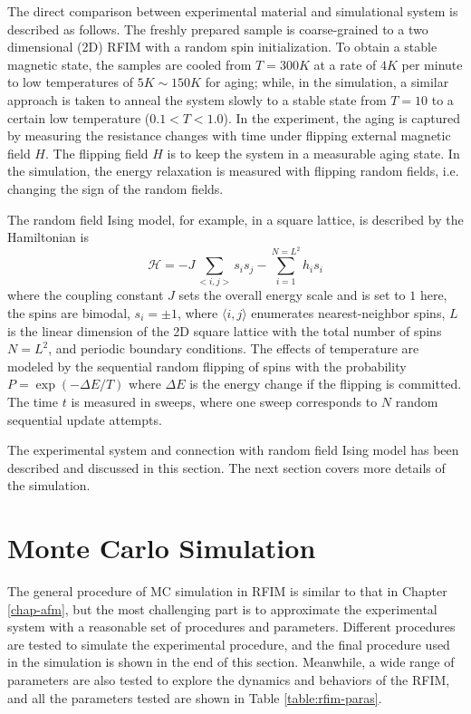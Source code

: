 The direct comparison between experimental material and simulational system is described as follows. The freshly prepared sample is coarse-grained to a two dimensional (2D) RFIM with a random spin initialization.  To obtain a stable magnetic state, the samples are cooled from $T=300K$ at a rate of $4K$ per minute to  low temperatures of $5K \sim 150K$ for aging; while, in the simulation, a similar approach is taken to anneal the system slowly to a stable state from $T=10$ to a certain low temperature ($0.1<T<1.0$). In the experiment, the aging is captured by measuring the resistance changes with time under flipping external magnetic field $H$. The flipping field $H$ is to keep the system in a measurable aging state. In the simulation, the energy relaxation is measured with flipping random fields, i.e. changing the sign of the random fields.

The random field Ising model, for example, in a square lattice, is described by the Hamiltonian is
\begin{equation}\label{energy}
\mathcal{H}=-J\sum_{<i,j>}s_{i}s_{j}-\sum_{i=1}^{N=L^{2}}h_{i}s_{i}
\end{equation}
where the coupling constant $J$ sets the overall energy scale and
is set to $1$ here, the spins are bimodal, $s_{i}=\pm1$, where $
\langle i,j \rangle$
enumerates nearest-neighbor spins,  $L$ is the linear dimension of the 2D square lattice with the total number of spins $N=L^{2}$, and periodic boundary conditions. The effects of temperature are modeled by the sequential random flipping of spins with the probability $P=\exp(-\Delta E/T)$ where $\Delta E$ is the energy change if the flipping is committed. The time $t$ is measured in sweeps, where one sweep corresponds to $N$ random sequential update attempts.  

The experimental system and connection with random field Ising model has been described and discussed in this section. The next section covers more details of the simulation.


\section{Monte Carlo Simulation}
The general procedure of MC simulation in RFIM is similar to that in Chapter \ref{chap-afm}, but the most challenging part is to approximate the experimental system with a reasonable set of procedures and parameters. Different procedures are tested to simulate the experimental procedure, and the final procedure used in the simulation is shown in the end of this section. Meanwhile, a wide range of parameters are also tested to explore the dynamics and behaviors of the RFIM, and all the parameters tested are shown in Table \ref{table:rfim-paras}. 

